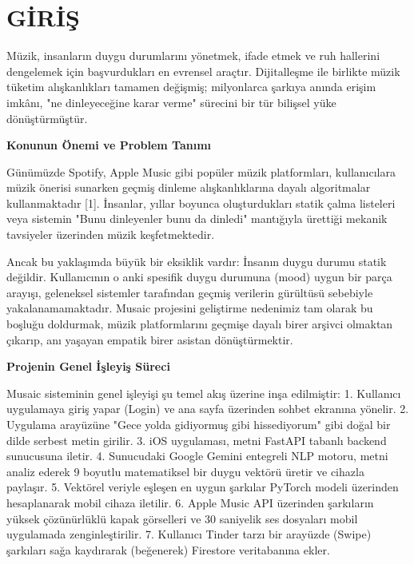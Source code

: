 \documentclass[12pt, a4paper]{report}
\begin{document}
\newpage
{}
\setcounter{page}{1}

\chapter*{GİRİŞ}
{}

Müzik, insanların duygu durumlarını yönetmek, ifade etmek ve ruh hallerini dengelemek için başvurdukları en evrensel araçtır. Dijitalleşme ile birlikte müzik tüketim alışkanlıkları tamamen değişmiş; milyonlarca şarkıya anında erişim imkânı, "ne dinleyeceğine karar verme" sürecini bir tür bilişsel yüke dönüştürmüştür. 

\vspace{0.5cm}
\noindent\textbf{Konunun Önemi ve Problem Tanımı}

Günümüzde Spotify, Apple Music gibi popüler müzik platformları, kullanıcılara müzik önerisi sunarken geçmiş dinleme alışkanlıklarına dayalı algoritmalar kullanmaktadır [1]. İnsanlar, yıllar boyunca oluşturdukları statik çalma listeleri veya sistemin "Bunu dinleyenler bunu da dinledi" mantığıyla ürettiği mekanik tavsiyeler üzerinden müzik keşfetmektedir. 

Ancak bu yaklaşımda büyük bir eksiklik vardır: İnsanın duygu durumu statik değildir. Kullanıcının o anki spesifik duygu durumuna (mood) uygun bir parça arayışı, geleneksel sistemler tarafından geçmiş verilerin gürültüsü sebebiyle yakalanamamaktadır. Musaic projesini geliştirme nedenimiz tam olarak bu boşluğu doldurmak, müzik platformlarını geçmişe dayalı birer arşivci olmaktan çıkarıp, anı yaşayan empatik birer asistan dönüştürmektir.

\vspace{0.5cm}
\noindent\textbf{Projenin Genel İşleyiş Süreci}

Musaic sisteminin genel işleyişi şu temel akış üzerine inşa edilmiştir:
1. Kullanıcı uygulamaya giriş yapar (Login) ve ana sayfa üzerinden sohbet ekranına yönelir.
2. Uygulama arayüzüne "Gece yolda gidiyormuş gibi hissediyorum" gibi doğal bir dilde serbest metin girilir.
3. iOS uygulaması, metni FastAPI tabanlı backend sunucusuna iletir.
4. Sunucudaki Google Gemini entegreli NLP motoru, metni analiz ederek 9 boyutlu matematiksel bir duygu vektörü üretir ve cihazla paylaşır.
5. Vektörel veriyle eşleşen en uygun şarkılar PyTorch modeli üzerinden hesaplanarak mobil cihaza iletilir.
6. Apple Music API üzerinden şarkıların yüksek çözünürlüklü kapak görselleri ve 30 saniyelik ses dosyaları mobil uygulamada zenginleştirilir.
7. Kullanıcı Tinder tarzı bir arayüzde (Swipe) şarkıları sağa kaydırarak (beğenerek) Firestore veritabanına ekler.
\end{document}
